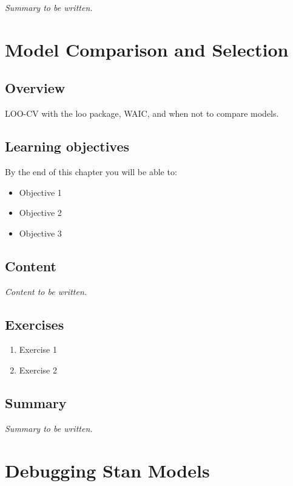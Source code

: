 \documentclass[
  11pt,
  a4paper,
  oneside,
  openany]{scrbook}
\providecommand{\tightlist}{%
  \setlength{\itemsep}{0pt}\setlength{\parskip}{0pt}}\usepackage{longtable,booktabs,array}
\begin{document}
\emph{Summary to be written.}

\chapter{Model Comparison and
Selection}\label{model-comparison-and-selection}

\section{Overview}\label{overview-13}

LOO-CV with the loo package, WAIC, and when not to compare models.

\section{Learning objectives}\label{learning-objectives-13}

By the end of this chapter you will be able to:

\begin{itemize}
\tightlist
\item[$\square$]
  Objective 1
\item[$\square$]
  Objective 2
\item[$\square$]
  Objective 3
\end{itemize}

\section{Content}\label{content-12}

\emph{Content to be written.}

\section{Exercises}\label{exercises-13}

\begin{enumerate}
\def\labelenumi{\arabic{enumi}.}
\tightlist
\item
  Exercise 1
\item
  Exercise 2
\end{enumerate}

\section{Summary}\label{summary-13}

\emph{Summary to be written.}

\chapter{Debugging Stan Models}\label{debugging-stan-models}
\end{document}
